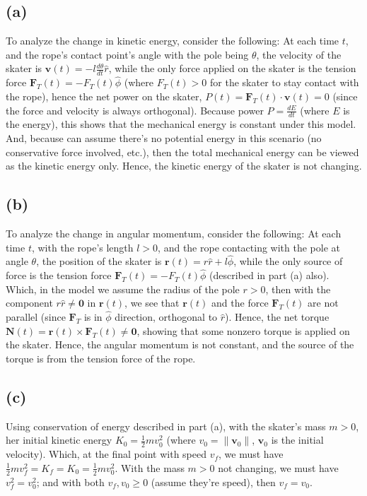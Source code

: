 \documentclass{article}
\newcommand{\br}{\textbf{r}} %
\newcommand{\bv}{\textbf{v}} %
\newcommand{\bF}{\textbf{F}} %
\newcommand{\bN}{\textbf{N}} %
\newcommand{\bzero}{\textbf{0}}
\begin{document}
\subsection*{(a)}
To analyze the change in kinetic energy, consider the following: At each time $t$, and the rope's contact point's angle with the pole being $\theta$, the velocity of the skater is $\bv(t)=-l\frac{d\theta}{dt}\hat{r}$, while the only force applied on the skater is the tension force $\bF_T(t) = -F_T(t)\hat{\phi}$ (where $F_T(t)>0$ for the skater to stay contact with the rope), hence the net power on the skater, $P(t) = \bF_T(t)\cdot \bv(t) = 0$ (since the force and velocity is always orthogonal). Because power $P=\frac{dE}{dt}$ (where $E$ is the energy), this shows that the mechanical energy is constant under this model. And, because can assume there's no potential energy in this scenario (no conservative force involved, etc.), then the total mechanical energy can be viewed as the kinetic energy only. Hence, the kinetic energy of the skater is not changing.

\subsection*{(b)}
To analyze the change in angular momentum, consider the following: At each time $t$, with the rope's length $l>0$, and the rope contacting with the pole at angle $\theta$, the position of the skater is $\br(t)=r\hat{r}+l\hat{\phi}$, while the only source of force is the tension force $\bF_T(t)=-F_T(t)\hat{\phi}$ (described in part (a) also). Which, in the model we assume the radius of the pole $r>0$, then with the component $r\hat{r}\neq\bzero$ in $\br(t)$, we see that $\br(t)$ and the force $\bF_T(t)$ are not parallel (since $\bF_T$ is in $\hat{\phi}$ direction, orthogonal to $\hat{r}$). Hence, the net torque $\bN(t) = \br(t)\times \bF_T(t)\neq \bzero$, showing that some nonzero torque is applied on the skater. Hence, the angular momentum is not constant, and the source of the torque is from the tension force of the rope.

\subsection*{(c)}
Using conservation of energy described in part (a), with the skater's mass $m>0$, her initial kinetic energy $K_0 = \frac{1}{2}mv_0^2$ (where $v_0=\|\bv_0\|$, $\bv_0$ is the initial velocity). Which, at the final point with speed $v_f$, we must have $\frac{1}{2}mv_f^2 = K_f = K_0 = \frac{1}{2}mv_0^2$. With the mass $m>0$ not changing, we must have $v_f^2=v_0^2$; and with both $v_f,v_0\geq 0$ (assume they're speed), then $v_f=v_0$.
\end{document}
